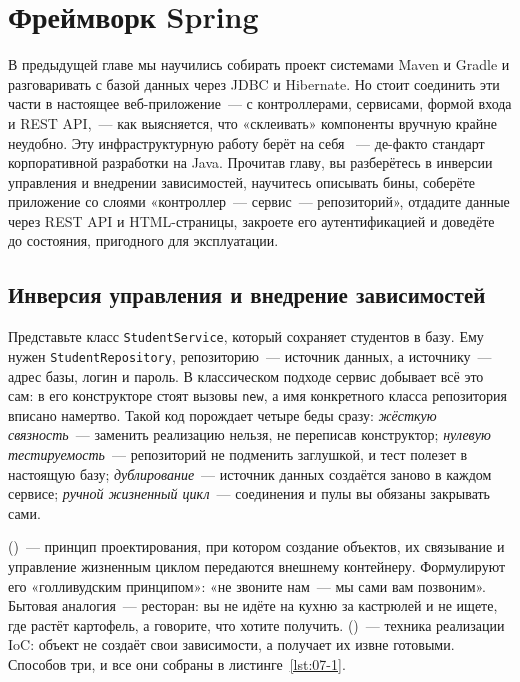 \chapter{Фреймворк Spring}
\label{ch:07}

В предыдущей главе мы научились собирать проект системами Maven и Gradle и
разговаривать с базой данных через JDBC и Hibernate. Но стоит соединить эти
части в настоящее веб-приложение~--- с контроллерами, сервисами, формой входа
и REST API,~--- как выясняется, что «склеивать» компоненты вручную крайне
неудобно. Эту инфраструктурную работу берёт на себя ~--- де-факто
стандарт корпоративной разработки на Java. Прочитав главу, вы разберётесь в
инверсии управления и внедрении зависимостей, научитесь описывать бины,
соберёте приложение со слоями «контроллер~--- сервис~--- репозиторий»,
отдадите данные через REST API и HTML-страницы, закроете его аутентификацией
и доведёте до состояния, пригодного для эксплуатации.

\section{Инверсия управления и внедрение зависимостей}

Представьте класс \texttt{StudentService}, который сохраняет студентов в базу.
Ему нужен \texttt{StudentRepository}, репозиторию~--- источник данных, а
источнику~--- адрес базы, логин и пароль. В классическом подходе сервис
добывает всё это сам: в его конструкторе стоят вызовы \texttt{new}, а имя
конкретного класса репозитория вписано намертво. Такой код порождает четыре
беды сразу: \emph{жёсткую связность}~--- заменить реализацию нельзя, не
переписав конструктор; \emph{нулевую тестируемость}~--- репозиторий не
подменить заглушкой, и тест полезет в настоящую базу; \emph{дублирование}~---
источник данных создаётся заново в каждом сервисе; \emph{ручной жизненный
цикл}~--- соединения и пулы вы обязаны закрывать сами.

 ()~--- принцип
проектирования, при котором создание объектов, их связывание и управление
жизненным циклом передаются внешнему контейнеру. Формулируют его
«голливудским принципом»: «не звоните нам~--- мы сами вам позвоним». Бытовая
аналогия~--- ресторан: вы не идёте на кухню за кастрюлей и не ищете, где растёт
картофель, а говорите, что хотите получить. 
()~--- техника реализации IoC: объект не создаёт
свои зависимости, а получает их извне готовыми. Способов три, и все они
собраны в листинге~\ref{lst:07-1}.

